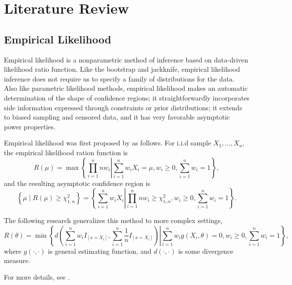 \chapter{Literature Review}

\section{Empirical Likelihood}

Empirical likelihood is a nonparametric method of inference based
on data-driven likelihood ratio function. Like the bootstrap and jackknife,
empirical likelihood inference does not require us to specify a family
of distributions for the data. 
Also like parametric likelihood methods,
empirical likelihood makes an automatic determination of the shape
of confidence regions; it straightforwardly incorporates side information
expressed through constraints or prior distributions; it extends to
biased sampling and censored data, and it has very favorable asymptotic
power properties.

Empirical likelihood was first proposed by \citet{owen1988empirical}
as follows. For i.i.d sample $X_{1},\ldots,X_{n},$ the empirical
likelihood ration function is 
\[
R\left(\mu\right)=\max\left\{ \left.\prod_{i=1}^{n}nw_{i}\right|\sum_{i=1}^{n}w_{i}X_{i}=\mu,w_{i}\ge0,\sum_{i=1}^{n}w_{i}=1\right\} ,
\]
and the resulting asymptotic confidence region is 
\begin{equation}
\left\{ \mu\mid R\left(\mu\right)\ge\chi_{1,\alpha}^{2}\right\} =\left\{ \left.\sum_{i=1}^{n}w_{i}X_{i}\right|\prod_{i=1}^{n}nw_{i}\ge\chi_{1,\alpha}^{2},w_{i}\ge0,\sum_{i=1}^{n}w_{i}=1\right\} .\label{eq:ci-original-el}
\end{equation}
\begin{comment}
rubin 1981 bayesian bootstrap in wu changbao. ? lit review asymp exp
obj prior. 
\end{comment}
The following research generalizes this method to more complex settings,
\[
R\left(\theta\right)=\min\left\{ \left.d\left(\sum_{i=1}^{n}w_{i}I_{\left[x=X_{i}\right]},\sum_{i=1}^{n}\frac{1}{n}I_{\left[x=X_{i}\right]}\right)\right|\sum_{i=1}^{n}w_{i}g\left(X_{i},\theta\right)=0,w_{i}\ge0,\sum_{i=1}^{n}w_{i}=1\right\} ,
\]
where $g\left(\cdot,\cdot\right)$ is general estimating function,
and $d\left(\cdot,\cdot\right)$ is some divergence measure.%
\begin{comment}
prob cov ch2 ch3
\end{comment}
{} For more details, see \citet{owen2010empirical}.


